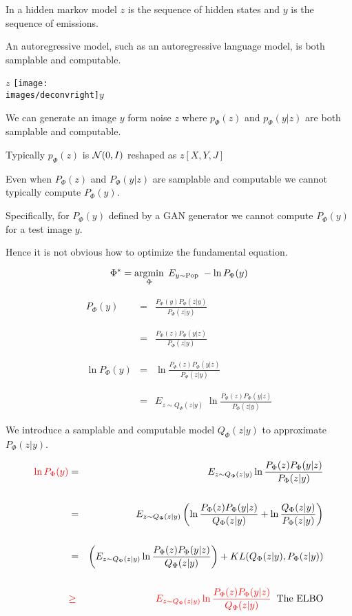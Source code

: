 {\vfill
In a hidden markov model $z$ is the sequence of hidden states and $y$ is the sequence of emissions.

\vfill
An autoregressive model, such as an autoregressive language model, is both samplable and computable.


\centerline{$z$ \texttt{[image: \\images/deconvright]}$y$}

\vfill
We can generate an image $y$ form noise $z$ where $p_\Phi(z)$ and $p_\Phi(y|z)$ are both samplable and computable.

\vfill
Typically $p_\Phi(z)$ is ${\cal N}(0,I)$ reshaped as $z[X,Y,J]$



\bigskip
\bigskip
Even when $P_\Phi(z)$ and $P_\Phi(y|z)$ are samplable and computable we cannot typically compute $P_\Phi(y)$.

\vfill
Specifically, for $P_\Phi(y)$ defined by a GAN generator we cannot compute $P_\Phi(y)$ for a test image $y$.

\vfill
Hence it is not obvious how to optimize the fundamental equation.

$$\Phi^* = \operatorname*{argmin}_\Phi\;E_{y \sim \mathrm{Pop}}\;- \ln P_\Phi(y)$$


{\huge
\begin{eqnarray*}
P_\Phi(y) & = & \frac{P_\Phi(y)P_\Phi(z|y)}{P_\Phi(z|y)} \\
\\
\\
& = & \frac{P_\Phi(z) P_\Phi(y|z)}{P_\Phi(z|y)} \\
\\
\\
\ln P_\Phi(y) & = & \ln \frac{P_\Phi(z) P_\Phi(y|z)}{P_\Phi(z|y)} \\
\\
\\
& = & E_{z \sim Q_\Phi(z|y)}\;\ln \frac{P_\Phi(z) P_\Phi(y|z)}{P_\Phi(z|y)}
\end{eqnarray*}
}


We introduce a samplable and computable model $Q_\Phi(z|y)$ to approximate $P_\Phi(z|y)$.

{\huge
\begin{eqnarray*}
 {\color{red} \ln P_\Phi(y)} & = & E_{z \sim Q_\Phi(z|y)} \ln \frac{P_\Phi(z)P_\Phi(y|z)}{P_\Phi(z|y)} \\
        \\
 & = & E_{z \sim Q_\Phi(z|y)} \left(\ln \frac{P_\Phi(z)P_\Phi(y|z)}{Q_\Phi(z|y)} + \ln \frac{Q_\Phi(z|y)}{P_\Phi(z|y)}\right) \\
 \\
  & = & \left(E_{z \sim Q_\Phi(z|y)} \ln \frac{P_\Phi(z)P_\Phi(y|z)}{Q_\Phi(z|y)}\right) + KL(Q_\Phi(z|y),P_\Phi(z|y)) \\
  \\
  & {\color{red} \geq} & {\color{red} E_{z \sim Q_\Phi(z|y)} \ln \frac{P_\Phi(z)P_\Phi(y|z)}{Q_\Phi(z|y)}}\;\;\mbox{The ELBO}
\end{eqnarray*}
}

}
